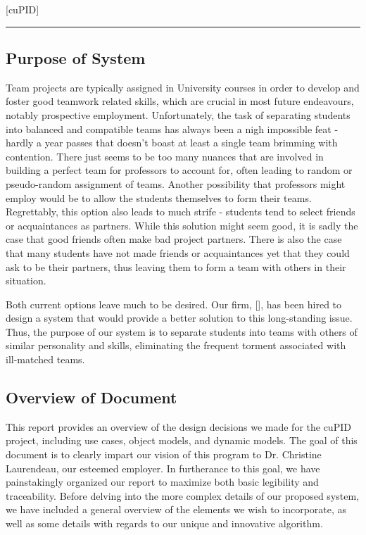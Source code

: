 \documentclass[12pt,letterpaper]{article}
\begin{document}
\begin{center}
	\Huge [cuPID]
\end{center}

\begin{center}
    \rule{0.85\textwidth}{0.5pt}
\end{center}

\subsection{Purpose of System}

Team projects are typically assigned in University courses in order to develop and foster
good teamwork related skills, which are crucial in most future endeavours, notably 
prospective employment. Unfortunately, the task of separating students into balanced 
and compatible teams has always been a nigh impossible feat - hardly a year passes that doesn't
boast at least a single team brimming with  contention. There just seems to be too many
nuances that are involved in building a perfect team for professors to account for, often leading
to random or pseudo-random assignment of teams. Another possibility that professors might employ
would be to allow the students themselves to form their teams. Regrettably, this option also
leads to much strife - students tend to select friends or acquaintances as partners. While this
solution might seem good, it is sadly the case that good friends often make bad project partners. 
There is also the case that many students have not made friends or acquaintances yet that they 
could ask to be their partners, thus leaving them to form a team with others in their situation.

Both current options leave much to be desired. Our firm, [\teamname{}], has been hired
to design a system that would provide a better solution to this long-standing issue. Thus, the purpose of
our system is to separate students into teams with others of similar personality and skills, eliminating 
the frequent torment associated with ill-matched teams.

\subsection{Overview of Document}

This report provides an overview of the design decisions we made for the cuPID project, including 
use cases, object models, and dynamic models. The goal of this document is to clearly impart our vision of this
program to Dr. Christine Laurendeau, our esteemed employer. In furtherance to this goal, we have painstakingly 
organized our report to maximize both basic legibility and traceability. Before delving into the more complex details 
of our proposed system, we have included a general overview of the elements we wish to incorporate, as well as 
some details with regards to our unique and innovative algorithm.
\end{document}
